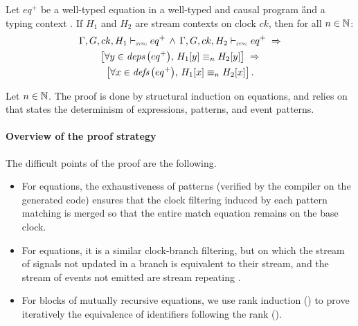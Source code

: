 \begin{lemma}
    \label{lem:semantics:grsync:theorems:determinism:eq}
    Let $eq^+$ be a well-typed equation in a well-typed and causal program \G and a typing context
    \tyCtx. If $H_1$ and $H_2$ are stream contexts on clock $ck$, then for all $n \in \N$:
    \begin{multline*}
        \eqDenot{H_1}{ck}{eq^+} \, \wedge \, \eqDenot{H_2}{ck}{eq^+}
        \; \Rightarrow \\
        \left[\forall y \in \deps{eq^+}, \, H_1[y] \equiv_n H_2[y]\right]
        \; \Rightarrow \\
        \left[\forall x \in \defs{eq^+}, \, H_1[x] \equiv_n H_2[x]\right].
    \end{multline*}
\end{lemma}
\begin{skippableproof}
    Let $n \in \N$. The proof is done by structural induction on \GRSync equations, and
    relies on  that states the determinism of \GRSync expressions,
    patterns, and event patterns.

    \paragraph{Overview of the proof strategy}
    The difficult points of the proof are the following.
    \begin{itemize}
        \item For  equations, the exhaustiveness of patterns (verified by the \Rust
              compiler on the generated code) ensures that the clock filtering induced by each
              pattern matching is merged so that the entire match equation remains on the base clock.
        \item For  equations, it is a similar clock-branch filtering, but on which the
              stream of signals not updated in a branch is equivalent to their  stream, and
              the stream of events not emitted are stream repeating \none.
        \item For blocks of mutually recursive equations, we use rank induction
              () to prove iteratively the
              equivalence of identifiers following the rank ().
    \end{itemize}



\end{skippableproof}
